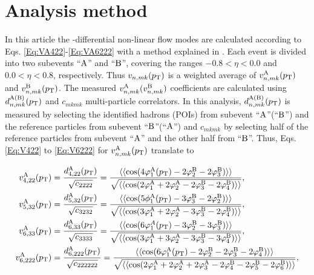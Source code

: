 \section{Analysis method}
\label{Sec:Analysis method}
In this article the \pT-differential non-linear flow modes are calculated  according to Eqs. \ref{Eq:VA422}-\ref{Eq:VA6222} with a method explained in \cite{Bilandzic:2013kga}. Each event is divided into two subevents ``$\rm{A}$'' and ``$\rm{B}$'', covering the ranges $-0.8< \eta < 0.0$ and $0.0 <\eta< 0.8$, respectively. Thus $v_{n,mk}(p_{\rm{T}})$ is a weighted average of $v_{n,mk}^{\rm{A}}(p_{\rm{T}})$ and $v_{n,mk}^{\rm{B}}(p_{\rm{T}})$. The measured $v_{n,mk}^{\rm{A}} (v_{n,mk}^{\rm{B}})$ coefficients are calculated using $d^{\rm{A(B)}}_{n,mk}(p_{\rm{T}})$ and $c_{mkmk}$ multi-particle correlators. In this analysis, $d^{\rm{A(B)}}_{n,mk}(p_{\rm{T}})$ is measured by selecting the identified hadrons (POIs) from subevent ``$\rm{A}$''(``$\rm{B}$'') and the reference particles from subevent ``$\rm{B}$''(``$\rm{A}$'') and $c_{mkmk}$ by selecting half of the reference particles from subevent ``$\rm{A}$'' and the other half from ``$\rm{B}$''. Thus, Eqs.\ref{Eq:V422} to \ref{Eq:V6222} for $v_{n,mk}^{\rm{A}}(p_{\rm{T}})$ translate to

\begin{align}
v_{4,22}^{\rm{A}}(p_{\rm{T}}) &= \frac{d_{4,22}^{\rm{A}}(p_{\rm{T}})}{\sqrt{c_{2222}}} =  \frac{\langle\langle \cos(4\varphi^{\rm{A}}_{1}(p_{\rm{T}})-2\varphi^{\rm{B}}_{2}-2\varphi^{\rm{B}}_{3})\rangle\rangle}{\sqrt{\langle\langle \cos(2\varphi^{\rm{A}}_{1}+2\varphi^{\rm{A}}_{2}-2\varphi^{\rm{B}}_{3}-2\varphi^{\rm{B}}_{4}) \rangle\rangle}}, \label{Eq:VA422} \\
v_{5,32}^{\rm{A}}(p_{\rm{T}}) &= \frac{d_{5,32}^{\rm{A}}(p_{\rm{T}})}{\sqrt{c_{3232}}} = \frac{\langle\langle \cos(5\phi^{\rm{A}}_{1}(p_{\rm{T}})-3\varphi^{\rm{B}}_{3}-2\varphi^{\rm{B}}_{2})\rangle\rangle}{\sqrt{\langle\langle \cos(3\varphi^{\rm{A}}_{1}+2\varphi^{\rm{A}}_{2}-3\varphi^{\rm{B}}_{3}-2\varphi^{\rm{B}}_{4}) \rangle\rangle}}, \label{Eq:VA532}\\
v_{6,33}^{\rm{A}}(p_{\rm{T}}) &= \frac{d_{6,33}^{\rm{A}}(p_{\rm{T}})}{\sqrt{c_{3333}}} =\frac{\langle\langle \cos(6\varphi^{A}_{1}(p_{\rm{T}})-3\varphi^{\rm{B}}_{2}-3\varphi^{\rm{B}}_{3})\rangle\rangle}{\sqrt{\langle\langle \cos(3\varphi^{\rm{A}}_{1}+3\varphi^{\rm{A}}_{2}-3\varphi^{\rm{B}}_{3}-3\varphi^{\rm{B}}_{4}) \rangle\rangle}}, \label{Eq:VA633}\\
v_{6,222}^{\rm{A}}(p_{\rm{T}}) &= \frac{d_{6,222}^{\rm{A}}(p_{\rm{T}})}{\sqrt{c_{222222}}} =\frac{\langle\langle \cos(6\varphi^{\rm{A}}_{1}(p_{\rm{T}})-2\varphi^{\rm{B}}_{2}-2\varphi^{\rm{B}}_{3}-2\varphi^{\rm{B}}_{4})\rangle\rangle}{\sqrt{\langle\langle \cos(2\varphi^{\rm{A}}_{1}+2\varphi^{\rm{A}}_{2}+2\varphi^{\rm{A}}_{3}-2\varphi^{\rm{B}}_{4}-2\varphi^{\rm{B}}_{5}-2\varphi^{\rm{B}}_{6}) \rangle\rangle}},
\label{Eq:VA6222}
\end{align}

